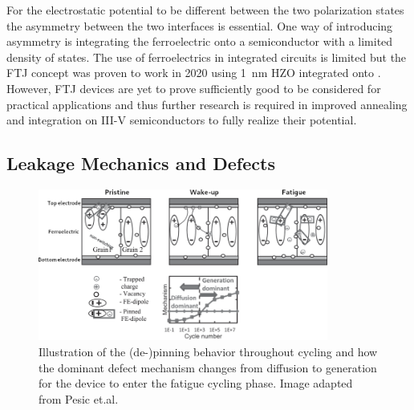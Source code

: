 \documentclass[11pt,twoside,final]{eitExjobb}  %
\begin{document}
For the electrostatic potential to be different between the two polarization
states the asymmetry between the two interfaces is essential. One way of
introducing asymmetry is integrating the ferroelectric onto a semiconductor
with a limited density of states. The use of ferroelectrics in integrated
circuits is limited but the FTJ concept was proven to work in 2020 using
\SI{1}{\nano\meter} HZO integrated onto  \cite{cheema2020one,
mikolajick2020past}. However, FTJ devices are yet to prove sufficiently good to
be considered for practical applications and thus further research is required
in improved annealing and integration on III-V semiconductors to fully realize
their potential.

\subsection{Leakage Mechanics and Defects}\label{sec:leakage}

\begin{figure}[htbp]
    \centering
    \includegraphics[width=0.85\textwidth]{fig/img/DomainPinning.png}
    \caption{Illustration of the (de-)pinning behavior throughout cycling and
        how the dominant defect mechanism changes from diffusion to generation
        for the device to enter the fatigue cycling phase. Image adapted from
        Pesic et.al. \cite{pesic2016physical}}
    \label{fig:theo_pinning}
\end{figure}
    
\end{document}
